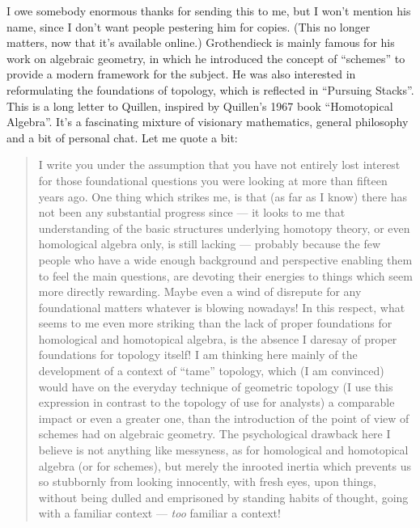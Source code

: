 \documentclass{article}
\def\tightlist{}
\renewcommand{\texttt}[1]{%
  \begingroup
  \ttfamily
  \begingroup\lccode`~=`/\lowercase{\endgroup\def~}{/\discretionary{}{}{}}%
  \begingroup\lccode`~=`[\lowercase{\endgroup\def~}{[\discretionary{}{}{}}%
  \begingroup\lccode`~=`.\lowercase{\endgroup\def~}{.\discretionary{}{}{}}%
  \catcode`/=\active\catcode`[=\active\catcode`.=\active
  \scantokens{#1\noexpand}%
  \endgroup
}
\begin{document}

I owe somebody enormous thanks for sending this to me, but I won't
mention his name, since I don't want people pestering him for copies.
(This no longer matters, now that it's available online.) Grothendieck
is mainly famous for his work on algebraic geometry, in which he
introduced the concept of ``schemes'' to provide a modern framework for
the subject. He was also interested in reformulating the foundations of
topology, which is reflected in ``Pursuing Stacks''. This is a long
letter to Quillen, inspired by Quillen's 1967 book ``Homotopical
Algebra''. It's a fascinating mixture of visionary mathematics, general
philosophy and a bit of personal chat. Let me quote a bit:

\begin{quote}
I write you under the assumption that you have not entirely lost
interest for those foundational questions you were looking at more than
fifteen years ago. One thing which strikes me, is that (as far as I
know) there has not been any substantial progress since --- it looks to
me that understanding of the basic structures underlying homotopy
theory, or even homological algebra only, is still lacking --- probably
because the few people who have a wide enough background and perspective
enabling them to feel the main questions, are devoting their energies to
things which seem more directly rewarding. Maybe even a wind of
disrepute for any foundational matters whatever is blowing nowadays! In
this respect, what seems to me even more striking than the lack of
proper foundations for homological and homotopical algebra, is the
absence I daresay of proper foundations for topology itself! I am
thinking here mainly of the development of a context of ``tame''
topology, which (I am convinced) would have on the everyday technique of
geometric topology (I use this expression in contrast to the topology of
use for analysts) a comparable impact or even a greater one, than the
introduction of the point of view of schemes had on algebraic geometry.
The psychological drawback here I believe is not anything like
messyness, as for homological and homotopical algebra (or for schemes),
but merely the inrooted inertia which prevents us so stubbornly from
looking innocently, with fresh eyes, upon things, without being dulled
and emprisoned by standing habits of thought, going with a familiar
context --- \emph{too} familiar a context!
\end{quote}
\end{document}
